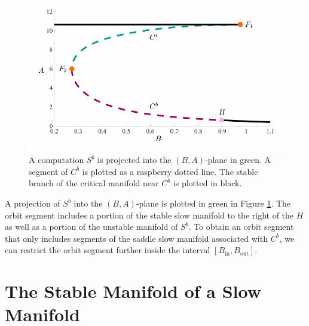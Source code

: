\documentclass{ws-ijbc}
\begin{document}
\begin{figure}[!t]
\begin{center}
\includegraphics[page=14, width=\textwidth]{figures.pdf}
\end{center}
\caption{A computation $S^b$ is projected into the $(B,A)$-plane in green.  A segment of $C^b$ is plotted as a raspberry dotted line.  The stable branch of the critical manifold near $C^b$ is plotted in black.}
\label{tube_figure_unstable}
\end{figure}

A projection of $S^b$ into the $(B,A)$-plane is plotted in green in Figure \ref{tube_figure_unstable}.  The orbit segment includes a portion of the stable slow manifold to the right of the $H$ as well as a portion of the unstable manifold of $S^b$.  To obtain an orbit segment that only includes segments of the saddle slow manifold associated with $C^b$, we can restrict the orbit segment further inside the interval $[B_{\mathrm{in}},B_{\mathrm{out}}]$.


\section{The Stable Manifold of a Slow Manifold}
\end{document}
